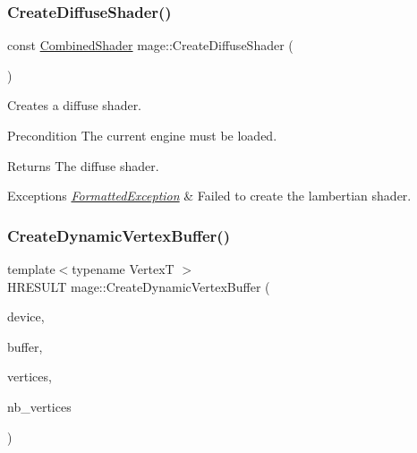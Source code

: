 \hypertarget{namespacemage_a485370b795ea208bc22a14cc60d5c590}{}\label{namespacemage_a485370b795ea208bc22a14cc60d5c590} 
\subsubsection{\texorpdfstring{Create\+Diffuse\+Shader()}{CreateDiffuseShader()}}
{\footnotesize\ttfamily const \hyperlink{structmage_1_1_combined_shader}{Combined\+Shader} mage\+::\+Create\+Diffuse\+Shader (\begin{DoxyParamCaption}{ }\end{DoxyParamCaption})}

Creates a diffuse shader.

\begin{DoxyPrecond}{Precondition}
The current engine must be loaded. 
\end{DoxyPrecond}
\begin{DoxyReturn}{Returns}
The diffuse shader. 
\end{DoxyReturn}

\begin{DoxyExceptions}{Exceptions}
{\em \hyperlink{structmage_1_1_formatted_exception}{Formatted\+Exception}} & Failed to create the lambertian shader. \\
\hline
\end{DoxyExceptions}
\hypertarget{namespacemage_aeb9bab1a9d739e3908c90db3832d9053}{}\label{namespacemage_aeb9bab1a9d739e3908c90db3832d9053} 
\subsubsection{\texorpdfstring{Create\+Dynamic\+Vertex\+Buffer()}{CreateDynamicVertexBuffer()}}
{\footnotesize\ttfamily template$<$typename VertexT $>$ \\
H\+R\+E\+S\+U\+LT mage\+::\+Create\+Dynamic\+Vertex\+Buffer (\begin{DoxyParamCaption}\item[{I\+D3\+D11\+Device2 $\ast$}]{device,  }\item[{I\+D3\+D11\+Buffer $\ast$$\ast$}]{buffer,  }\item[{const VertexT $\ast$}]{vertices,  }\item[{size\+\_\+t}]{nb\+\_\+vertices }\end{DoxyParamCaption})}

